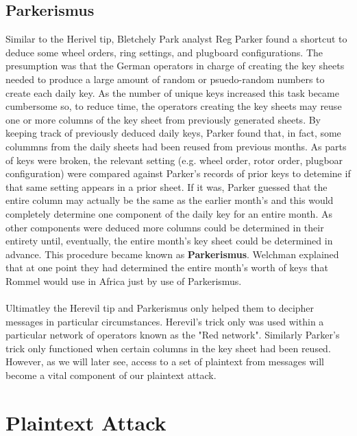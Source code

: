 \subsection{Parkerismus}
Similar to the Herivel tip, Bletchely Park analyst Reg Parker found a
shortcut to deduce some wheel orders, ring settings, and plugboard
configurations. The presumption was that the German operators in
charge of creating the key sheets needed to produce a large amount of
random or psuedo-random numbers to create each daily key. As the
number of unique keys increased this task became cumbersome so, to
reduce time, the operators creating the key sheets may reuse one or
more columns of the key sheet from previously generated sheets. By
keeping track of previously deduced daily keys, Parker found that, in
fact, some colummns from the daily sheets had been reused from
previous months. As parts of keys were broken, the relevant setting
(e.g. wheel order, rotor order, plugboar configuration) were compared
against Parker's records of prior keys to detemine if that same
setting appears in a prior sheet. If it was, Parker guessed that the
entire column may actually be the same as the earlier month's and
this would completely determine one component of the daily key for an
entire month. As other components were deduced more columns could be
determined in their entirety until, eventually, the entire month's
key sheet could be determined in advance. This procedure became known
as {\bf{Parkerismus}}. Welchman explained that at one point they had
determined the entire month's worth of keys that Rommel would use in
Africa just by use of Parkerismus.
\\\\Ultimatley the Herevil tip and Parkerismus only helped them to
decipher messages in particular circumstances. Herevil's trick only
was used within a
particular network of operators known as the "Red network". Similarly
Parker's trick only functioned when certain columns in the key sheet
had been reused. However,
as we will later see, access to a set of plaintext from messages will
become a vital component of our plaintext attack.

\section{Plaintext Attack}

